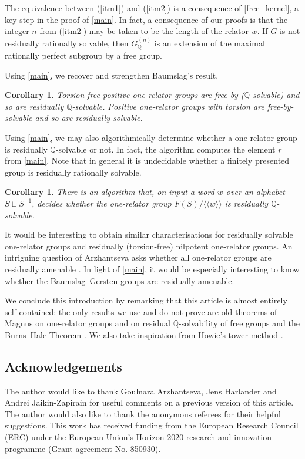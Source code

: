 \documentclass{amsart}
\newtheorem{corollary}[theorem]{Corollary}
\theoremstyle{definition}
\newcommand{\Q}{\mathbb{Q}}
\newcommand{\normal}[1]{\langle\!\langle #1 \rangle\!\rangle}
\begin{document}
The equivalence between (\ref{itm1}) and (\ref{itm2}) is a consequence of \cref{free_kernel}, a key step in the proof of \cref{main}. In fact, a consequence of our proofs is that the integer $n$ from (\ref{itm2}) may be taken to be the length of the relator $w$. If $G$ is not residually rationally solvable, then $G^{(n)}_{\Q}$ is an extension of the maximal rationally perfect subgroup by a free group.

Using \cref{main}, we recover and strengthen Baumslag's result.

\begin{corollary}
\label{positive}
Torsion-free positive one-relator groups are free-by-($\Q$-solvable) and so are residually $\Q$-solvable. Positive one-relator groups with torsion are free-by-solvable and so are residually solvable.
\end{corollary}

Using \cref{main}, we may also algorithmically determine whether a one-relator group is residually $\Q$-solvable or not. In fact, the algorithm computes the element $r$ from \cref{main}. Note that in general it is undecidable whether a finitely presented group is residually rationally solvable. 

\begin{corollary}
\label{algorithm}
There is an algorithm that, on input a word $w$ over an alphabet $S\sqcup S^{-1}$, decides whether the one-relator group $F(S)/\normal{w}$ is residually $\Q$-solvable.
\end{corollary}

It would be interesting to obtain similar characterisations for residually solvable one-relator groups and residually (torsion-free) nilpotent one-relator groups. An intriguing question of Arzhantseva asks whether all one-relator groups are residually amenable \cite[Problem 18.6]{Ko18}. In light of \cref{main}, it would be especially interesting to know whether the Baumslag--Gersten groups are residually amenable.

We conclude this introduction by remarking that this article is almost entirely self-contained: the only results we use and do not prove are old theorems of Magnus on one-relator groups \cite{Ma30,Ma32} and on residual $\Q$-solvability of free groups \cite{Ma35} and the Burns--Hale Theorem \cite{BH72}. We also take inspiration from Howie's tower method \cite{Ho81}.

\subsection*{Acknowledgements}
The author would like to thank Goulnara Arzhantseva, Jens Harlander and Andrei Jaikin-Zapirain for useful comments on a previous version of this article. The author would also like to thank the anonymous referees for their helpful suggestions. This work has received funding from the European Research Council (ERC) under the European Union's Horizon 2020 research and innovation programme (Grant agreement No. 850930).
\end{document}
